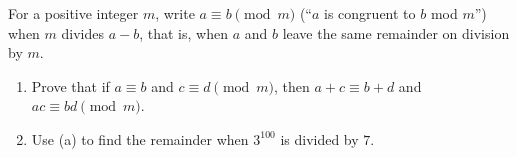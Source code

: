 For a positive integer $m$, write $a\equiv b\pmod m$ (``$a$ is congruent to $b$ mod $m$'') when $m$ divides $a-b$, that is, when $a$ and $b$ leave the same remainder on division by $m$.
\begin{enumerate}
\item[(a)] Prove that if $a\equiv b$ and $c\equiv d\pmod m$, then $a+c\equiv b+d$ and $ac\equiv bd\pmod m$.
\item[(b)] Use (a) to find the remainder when $3^{100}$ is divided by $7$.
\end{enumerate}
